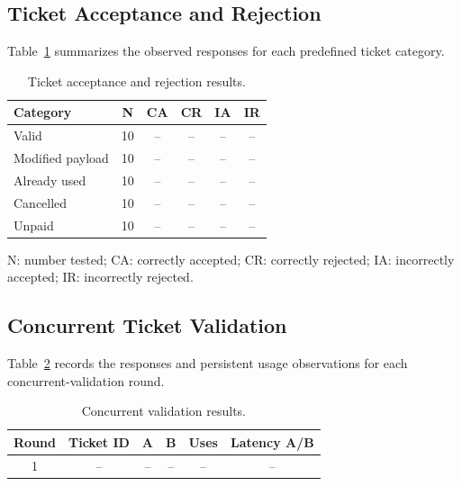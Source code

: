 \documentclass[runningheads]{llncs}
\begin{document}

\subsection{Ticket Acceptance and Rejection}

Table~\ref{tab:ticket-results} summarizes the observed responses for
each predefined ticket category.

\begin{table}
\caption{Ticket acceptance and rejection results.}
\label{tab:ticket-results}
\centering
\begin{tabular}{|p{2.5cm}|c|c|c|c|c|}
\hline
\textbf{Category} & \textbf{N} & \textbf{CA} & \textbf{CR}
& \textbf{IA} & \textbf{IR} \\
\hline
Valid & 10 & -- & -- & -- & -- \\
\hline
Modified payload & 10 & -- & -- & -- & -- \\
\hline
Already used & 10 & -- & -- & -- & -- \\
\hline
Cancelled & 10 & -- & -- & -- & -- \\
\hline
Unpaid & 10 & -- & -- & -- & -- \\
\hline
\end{tabular}

\smallskip
\parbox{0.9\textwidth}{\footnotesize
N: number tested; CA: correctly accepted; CR: correctly rejected;
IA: incorrectly accepted; IR: incorrectly rejected.}
\end{table}


\subsection{Concurrent Ticket Validation}

Table~\ref{tab:concurrency-results} records the responses and
persistent usage observations for each concurrent-validation round.

\begin{table}
\caption{Concurrent validation results.}
\label{tab:concurrency-results}
\centering
\begin{tabular}{|c|c|c|c|c|c|}
\hline
\textbf{Round} & \textbf{Ticket ID} & \textbf{A} & \textbf{B}
& \textbf{Uses} & \textbf{Latency A/B} \\
\hline
1 & -- & -- & -- & -- & -- \\
\hline
\end{tabular}
\end{table}
\end{document}
